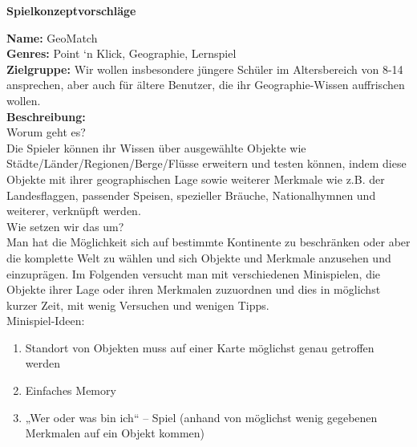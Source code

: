 \documentclass[a4paper]{article}
\newcommand{\changefont}[3]{
\fontfamily{#1} \fontseries{#2} \fontshape{#3} \selectfont}
\begin{document}
\changefont{cmss}{m}{n} %

\begin{center}
\textbf{\huge Spielkonzeptvorschläge}
\end{center}


\vspace{5mm}

\textbf{Name:} GeoMatch\\
\textbf{Genres:} Point ‘n Klick, Geographie, Lernspiel\\
\textbf{Zielgruppe:} Wir wollen insbesondere jüngere Schüler im Altersbereich von 8-14 ansprechen, aber auch für ältere Benutzer, die ihr Geographie-Wissen auffrischen wollen.\\
\textbf{Beschreibung:}\\
Worum geht es?\\
Die Spieler können ihr Wissen über ausgewählte Objekte wie Städte/Länder/Regionen/Berge/Flüsse erweitern und testen können, indem diese Objekte mit ihrer geographischen Lage sowie weiterer Merkmale wie z.B. der Landesflaggen, passender Speisen, spezieller Bräuche, Nationalhymnen und weiterer, verknüpft werden.\\
Wie setzen wir das um?\\
Man hat die Möglichkeit sich auf bestimmte Kontinente zu beschränken oder aber die komplette Welt zu wählen und sich Objekte und Merkmale anzusehen und einzuprägen.
Im Folgenden versucht man mit verschiedenen Minispielen, die Objekte ihrer Lage oder ihren Merkmalen zuzuordnen und dies in möglichst kurzer Zeit, mit wenig Versuchen und wenigen Tipps.\\
Minispiel-Ideen:\\
\begin{enumerate}
\item Standort von Objekten muss auf einer Karte möglichst genau getroffen werden
\item Einfaches Memory
\item „Wer oder was bin ich“ – Spiel (anhand von möglichst wenig gegebenen Merkmalen auf ein Objekt kommen) 
\end{enumerate}

\vspace{1cm}
\end{document}
